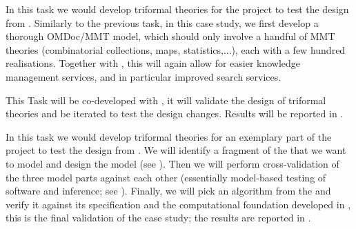 \begin{workpackage}[id=dksbases,%
  title=Data/Knowledge/Software-Bases,lead=JU,
  ZHRM=12,JURM=36,UWRM=25,SARM=10,LLRM=2,PSRM=4]
\begin{tasklist}

\begin{task}[title=FindStat Case Study (triformal theories),id=data-findstat,
  lead=JU,partners={ZH},PM=9,wphases=18-30!.5]
  In this task we would develop triformal theories for the \FindStat project to test the
  design from .  Similarly to the previous task, in this
  case study, we first develop a thorough OMDoc/MMT model, which should only involve a
  handful of MMT theories (combinatorial collections, maps, statistics,...), each with a
  few hundred realisations. Together with   , this will again allow for
  easier knowledge management services, and in particular improved search services.

  This Task will be co-developed with , it will validate
  the design of triformal theories and be iterated to test the design changes. Results
  will be reported in .
\end{task}

\begin{task}[title=\LMFDB Case study (triformal theories),id=data-LMFDB,
  lead=JU,partners={ZH,UW},PM=24,wphases={12-24!.25,24-48!.4}]
  In this task we would develop triformal theories for an exemplary part of the \LMFDB
  project to test the design from .  We will identify a
  fragment of the \LMFDB that we want to model and design the model (see
  ). Then we will perform cross-validation of the three model parts
  against each other (essentially model-based testing of software and inference; see
  ). Finally, we will pick an algorithm from the \LMFDB and verify
  it against its specification and the computational foundation developed in
  , this is the final validation of the case study; the
  results are reported in .
  \end{task}


\end{tasklist}
\end{workpackage}
